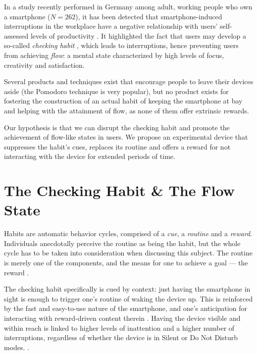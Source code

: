 \documentclass[format=acmsmall]{acmart}
\begin{document}
In a study recently performed in Germany among adult, working people who own a smartphone ($N=262$), it has been detected that smartphone-induced interruptions in the workplace have a negative relationship with users' self-assessed levels of productivity \cite{duke_montag_2017}. It highlighted the fact that users may develop a so-called \textit{checking habit} \cite{oulasvirta_rattenbury_ma_raita_2011}, which leads to interruptions, hence preventing users from achieving \textit{flow}: a mental state characterized by high levels of focus, creativity and satisfaction.

Several products\cite{biber}\cite{amazon_01}\cite{amazon_02} and techniques exist that encourage people to leave their devices aside (the Pomodoro technique\cite{cirillo_2018} is very popular), but no product exists for fostering the construction of an actual habit of keeping the smartphone at bay and helping with the attainment of flow, as none of them offer extrinsic rewards.

Our hypothesis is that we can disrupt the checking habit and promote the achievement of flow-like states in users. We propose an experimental device that suppresses the habit's cues, replaces its routine and offers a reward for not interacting with the device for extended periods of time. 

\section{The Checking Habit \& The Flow State}

Habits are automatic behavior cycles, comprised of a \textit{cue}, a \textit{routine} and a \textit{reward}. Individuals anecdotally perceive the routine as being the habit, but the whole cycle has to be taken into consideration when discussing this subject. The routine is merely one of the components, and the means for one to achieve a goal --- the reward \cite{duhigg_2014}.

The checking habit specifically is cued by context: just having the smartphone in sight is enough to trigger one's routine of waking the device up. This is reinforced by the fast and easy-to-use nature of the smartphone, and one's anticipation for interacting with reward-driven content therein \cite{oulasvirta_rattenbury_ma_raita_2011}. Having the device visible and within reach is linked to higher levels of inattention and a higher number of interruptions, regardless of whether the device is in Silent or Do Not Disturb modes. \cite{kushlev_proulx_dunn_2016}. 
\end{document}
